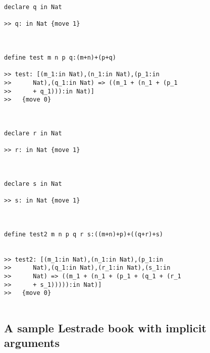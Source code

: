 \documentclass[12pt]{article}
\begin{document}
\begin{verbatim}
declare q in Nat

>> q: in Nat {move 1}



define test m n p q:(m+n)+(p+q)

>> test: [(m_1:in Nat),(n_1:in Nat),(p_1:in
>>      Nat),(q_1:in Nat) => ((m_1 + (n_1 + (p_1
>>      + q_1))):in Nat)]
>>   {move 0}



declare r in Nat

>> r: in Nat {move 1}



declare s in Nat

>> s: in Nat {move 1}



define test2 m n p q r s:((m+n)+p)+((q+r)+s)


>> test2: [(m_1:in Nat),(n_1:in Nat),(p_1:in
>>      Nat),(q_1:in Nat),(r_1:in Nat),(s_1:in
>>      Nat) => ((m_1 + (n_1 + (p_1 + (q_1 + (r_1
>>      + s_1))))):in Nat)]
>>   {move 0}


\end{verbatim}

\newpage

\subsection {A sample Lestrade book with implicit arguments}
\end{document}
